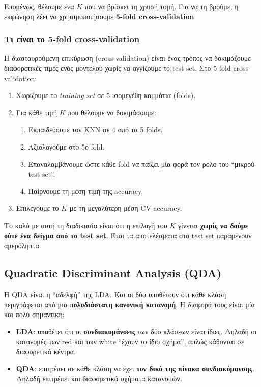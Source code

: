\documentclass[11pt,a4paper]{article}
\newcommand{\eng}[1]{\textenglish{#1}}
\begin{document}
Επομένως, θέλουμε ένα \(K\) που να βρίσκει τη χρυσή τομή. Για να τη
βρούμε, η εκφώνηση λέει να χρησιμοποιήσουμε \textbf{5-fold
cross-validation}.

\subsubsection{Τι είναι το 5-fold cross-validation}

Η διασταυρούμενη επικύρωση (\eng{cross-validation}) είναι ένας τρόπος να
δοκιμάζουμε διαφορετικές τιμές ενός μοντέλου χωρίς να αγγίζουμε το test
set. Στο 5-fold cross-validation:
\begin{enumerate}
    \item Χωρίζουμε το \emph{training set} σε 5 ισομεγέθη κομμάτια
    (\eng{folds}).
    \item Για κάθε τιμή \(K\) που θέλουμε να δοκιμάσουμε:
    \begin{enumerate}
        \item Εκπαιδεύουμε τον KNN σε 4 από τα 5 folds.
        \item Αξιολογούμε στο 5ο fold.
        \item Επαναλαμβάνουμε ώστε κάθε fold να παίξει μία φορά τον ρόλο
        του ``μικρού test set''.
        \item Παίρνουμε τη μέση τιμή της accuracy.
    \end{enumerate}
    \item Επιλέγουμε το \(K\) με τη μεγαλύτερη μέση CV accuracy.
\end{enumerate}

Το καλό με αυτή τη διαδικασία είναι ότι η επιλογή του \(K\) γίνεται
\textbf{χωρίς να δούμε ούτε ένα δείγμα από το test set}. Έτσι τα
αποτελέσματα στο test set παραμένουν αμερόληπτα.

\subsection{Quadratic Discriminant Analysis (QDA)}

Η QDA είναι η ``αδελφή'' της LDA. Και οι δύο υποθέτουν ότι κάθε κλάση
περιγράφεται από μια \textbf{πολυδιάστατη κανονική κατανομή}. Η διαφορά
τους είναι μία και πολύ σημαντική:

\begin{itemize}
    \item \textbf{LDA}: υποθέτει ότι οι \textbf{συνδιακυμάνσεις} των δύο
    κλάσεων είναι ίδιες. Δηλαδή οι κατανομές των red και των white
    ``έχουν το ίδιο σχήμα'', απλώς κάθονται σε διαφορετικά κέντρα.
    \item \textbf{QDA}: επιτρέπει σε κάθε κλάση να έχει \textbf{τον δικό
    της πίνακα συνδιακύμανσης}. Δηλαδή επιτρέπει και διαφορετικά σχήματα
    κατανομών.
\end{itemize}
\end{document}
